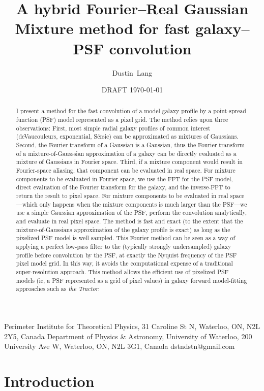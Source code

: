 \documentclass[11pt,preprint]{aastex}
\newcommand{\project}[1]{\textsl{#1}}
\newcommand{\sersic}{S\'ersic}
\begin{document}
\title{A hybrid Fourier--Real Gaussian Mixture method for fast galaxy--PSF convolution}
\author{Dustin~Lang}
%
{Perimeter Institute for Theoretical Physics,
  31 Caroline St N, Waterloo, ON, N2L 2Y5, Canada}
%
{Department of Physics \& Astronomy,
 University of Waterloo,
 200 University Ave W, Waterloo, ON, N2L 3G1, Canada}
%
{dstndstn@gmail.com}
\date{DRAFT \today}

\begin{abstract}
  I present a method for the fast convolution of a model galaxy
  profile by a point-spread function (PSF) model represented as a pixel grid.
  The method relies upon three
  observations: First, most simple radial galaxy profiles of common interest
  (deVaucouleurs, exponential, \sersic) can be approximated as
  mixtures of Gaussians.  Second, the Fourier transform of a Gaussian
  is a Gaussian, thus the Fourier transform of a mixture-of-Gausssian
  approximation of a galaxy can be directly evaluated as a mixture of Gaussians
  in Fourier space.
  Third, if a mixture component would result in Fourier-space aliasing, that
  component can be evaluated in real space.
  For mixture components to be evaluated in Fourier space, we
  use the FFT for the PSF model, direct evaluation of the Fourier
  transform for the galaxy, and the inverse-FFT to return the result to
  pixel space.
  For mixture components to be evaluated in real space---which only happens when the mixture
  components is much larger than the PSF---we use a simple Gaussian approximation of
  the PSF, perform the convolution analytically, and evaluate in real pixel space.
  The method is fast and exact (to the extent that the mixture-of-Gaussians
  approximation of the galaxy profile is exact) as long as the pixelized PSF
  model is well sampled.
  This Fourier method can be seen as a way of applying a perfect low-pass filter to
  the (typically strongly undersampled) galaxy profile before convolution by
  the PSF, at exactly the Nyquist frequency of the PSF pixel model grid.  In
  this way, it avoids the computational expense of a traditional super-resolution
  approach.
  This method allows
  the efficient use of pixelized PSF models (ie, a PSF represented as
  a grid of pixel values) in galaxy forward model-fitting approaches such as
  \project{the Tractor}.
\end{abstract}

\section{Introduction}
\end{document}
